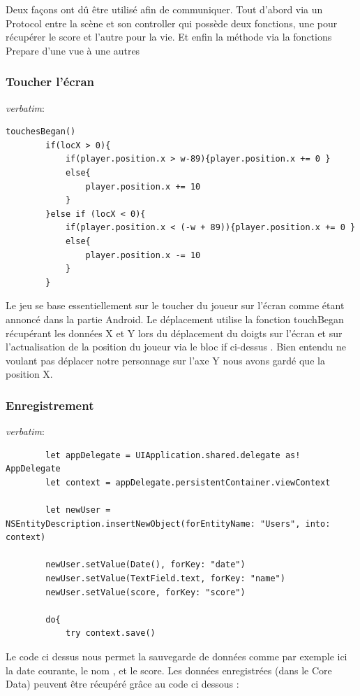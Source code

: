 \documentclass{article}
\begin{document}
Deux façons ont dû être utilisé afin de communiquer. Tout d'abord  via un Protocol entre la scène et son controller qui possède deux fonctions, une pour récupérer le score et l'autre pour la vie. Et enfin la méthode via la fonctions Prepare d'une vue à une autres

\subsubsection{Toucher l'écran}
\textit{verbatim}:
\begin{verbatim}
touchesBegan()
        if(locX > 0){
            if(player.position.x > w-89){player.position.x += 0 }
            else{
                player.position.x += 10
            }
        }else if (locX < 0){
            if(player.position.x < (-w + 89)){player.position.x += 0 }
            else{
                player.position.x -= 10
            }
        }

\end{verbatim}

Le jeu se base essentiellement sur le toucher du joueur sur l'écran comme étant annoncé dans la partie Android. Le déplacement utilise  la fonction touchBegan  récupérant les données X et Y lors du déplacement du doigts sur l'écran et sur l'actualisation de la position du joueur via le bloc if ci-dessus . Bien entendu ne voulant pas déplacer notre personnage sur l'axe Y nous avons gardé que la position X. 

\subsubsection{Enregistrement}
\textit{verbatim}:
\begin{verbatim}
        let appDelegate = UIApplication.shared.delegate as! AppDelegate
        let context = appDelegate.persistentContainer.viewContext
        
        let newUser = NSEntityDescription.insertNewObject(forEntityName: "Users", into: context)
        
        newUser.setValue(Date(), forKey: "date")
        newUser.setValue(TextField.text, forKey: "name")
        newUser.setValue(score, forKey: "score")
        
        do{
            try context.save()
\end{verbatim}

Le code ci dessus nous permet la sauvegarde de données comme par exemple ici la date courante, le nom , et le score. Les données enregistrées (dans le Core Data) peuvent être récupéré grâce au code ci dessous :
\end{document}
